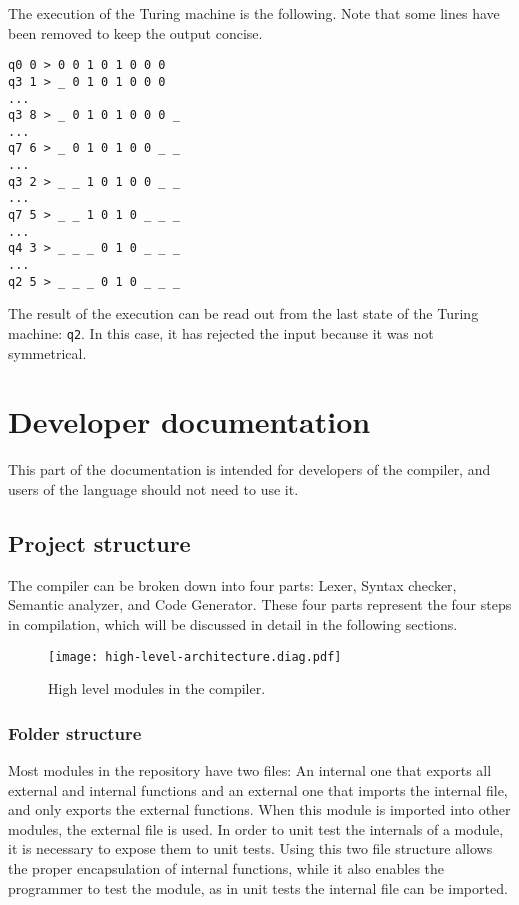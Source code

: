 \documentclass[12pt]{article}
\begin{document}
The execution of the Turing machine is the following. Note that some lines have
been removed to keep the output concise.
\begin{lstlisting}
q0 0 > 0 0 1 0 1 0 0 0 
q3 1 > _ 0 1 0 1 0 0 0 
...
q3 8 > _ 0 1 0 1 0 0 0 _ 
...
q7 6 > _ 0 1 0 1 0 0 _ _ 
...
q3 2 > _ _ 1 0 1 0 0 _ _ 
...
q7 5 > _ _ 1 0 1 0 _ _ _ 
...
q4 3 > _ _ _ 0 1 0 _ _ _ 
...
q2 5 > _ _ _ 0 1 0 _ _ _ 
\end{lstlisting}
The result of the execution can be read out from the last state of the Turing
machine: \verb$q2$. In this case, it has rejected the input because it was not
symmetrical.

\lstset{numbers=left}

\pagebreak
\section{Developer documentation}

This part of the documentation is intended for developers of the compiler, and
users of the language should not need to use it.

\subsection{Project structure}

The compiler can be broken down into four parts: Lexer, Syntax checker, Semantic
analyzer, and Code Generator. These four parts represent the four steps in
compilation, which will be discussed in detail in the following sections.

\begin{figure}[h]
\texttt{[image: high-level-architecture.diag.pdf]}
\centering
\caption{High level modules in the compiler.}
\end{figure}

\subsubsection{Folder structure}

Most modules in the repository have two files: An internal one that exports all
external and internal functions and an external one that imports the internal
file, and only exports the external functions. When this module is imported into
other modules, the external file is used. In order to unit test the internals of
a module, it is necessary to expose them to unit tests. Using this two file
structure allows the proper encapsulation of internal functions, while it also
enables the programmer to test the module, as in unit tests the internal file
can be imported.
\end{document}
